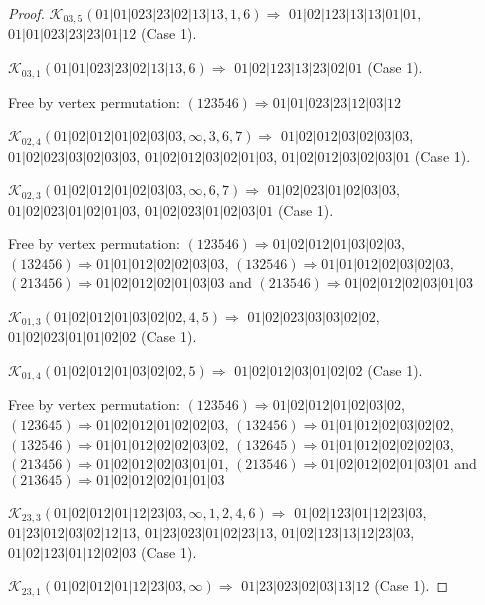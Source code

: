 \documentclass[12pt]{article}
\theoremstyle{plain}
\theoremstyle{definition}
\theoremstyle{remark}
\newcommand{\fancy}[1]{\mathcal{#1}}
\def\K{\fancy{K}}
\begin{document}
\begin{proof}
	$\K_{03,5}(01|01|023|23|02|13|13,1, 6)\Rightarrow $ $01|02|123|13|13|01|01$, $01|01|023|23|23|01|12$ (Case 1).
	
	$\K_{03,1}(01|01|023|23|02|13|13,6)\Rightarrow $ $01|02|123|13|23|02|01$ (Case 1).
	
	
	
	Free by vertex permutation: $(1 2 3 5 4 6)\Rightarrow 01|01|023|23|12|03|12$
	
	
	
	\bigskip
	
	$\K_{02,4}(01|02|012|01|02|03|03,\infty,3, 6, 7)\Rightarrow $ $01|02|012|03|02|03|03$, $01|02|023|03|02|03|03$, $01|02|012|03|02|01|03$, $01|02|012|03|02|03|01$ (Case 1).
	
	$\K_{02,3}(01|02|012|01|02|03|03,\infty,6, 7)\Rightarrow $ $01|02|023|01|02|03|03$, $01|02|023|01|02|01|03$, $01|02|023|01|02|03|01$ (Case 1).
	
	
	
	Free by vertex permutation: $(1 2 3 5 4 6)\Rightarrow 01|02|012|01|03|02|03$, $(1 3 2 4 5 6)\Rightarrow 01|01|012|02|02|03|03$, $(1 3 2 5 4 6)\Rightarrow 01|01|012|02|03|02|03$, $(2 1 3 4 5 6)\Rightarrow 01|02|012|02|01|03|03$ and $(2 1 3 5 4 6)\Rightarrow 01|02|012|02|03|01|03$
	
	
	
	\bigskip
	
	$\K_{01,3}(01|02|012|01|03|02|02,4, 5)\Rightarrow $ $01|02|023|03|03|02|02$, $01|02|023|01|01|02|02$ (Case 1).
	
	$\K_{01,4}(01|02|012|01|03|02|02,5)\Rightarrow $ $01|02|012|03|01|02|02$ (Case 1).
	
	
	
	Free by vertex permutation: $(1 2 3 5 4 6)\Rightarrow 01|02|012|01|02|03|02$, $(1 2 3 6 4 5)\Rightarrow 01|02|012|01|02|02|03$, $(1 3 2 4 5 6)\Rightarrow 01|01|012|02|03|02|02$, $(1 3 2 5 4 6)\Rightarrow 01|01|012|02|02|03|02$, $(1 3 2 6 4 5)\Rightarrow 01|01|012|02|02|02|03$, $(2 1 3 4 5 6)\Rightarrow 01|02|012|02|03|01|01$, $(2 1 3 5 4 6)\Rightarrow 01|02|012|02|01|03|01$ and $(2 1 3 6 4 5)\Rightarrow 01|02|012|02|01|01|03$
	
	
	
	\bigskip
	
	$\K_{23,3}(01|02|012|01|12|23|03,\infty,1, 2, 4, 6)\Rightarrow $ $01|02|123|01|12|23|03$, $01|23|012|03|02|12|13$, $01|23|023|01|02|23|13$, $01|02|123|13|12|23|03$, $01|02|123|01|12|02|03$ (Case 1).
	
	$\K_{23,1}(01|02|012|01|12|23|03,\infty)\Rightarrow $ $01|23|023|02|03|13|12$ (Case 1).
	

\end{proof}
\end{document}

